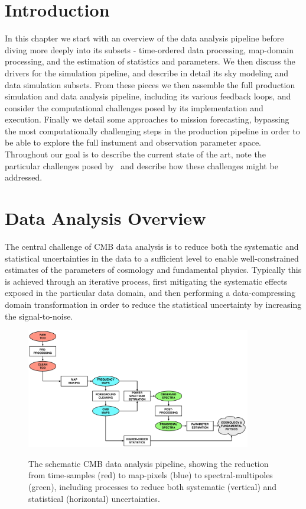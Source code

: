 \section{Introduction}

In this chapter we start with an overview of the data analysis pipeline before diving more deeply into its subsets - time-ordered data processing, map-domain processing, and the estimation of statistics and parameters. We then discuss the drivers for the simulation pipeline, and describe in detail its sky modeling and data simulation subsets. From these pieces we then assemble the full production simulation and data analysis pipeline, including its various feedback loops, and consider the computational challenges posed by its implementation and execution. Finally we detail some approaches to mission forecasting, bypassing the most computationally challenging steps in the production pipeline in order to be able to explore the full instument and observation parameter space. Throughout our goal is to describe the current state of the art, note the particular challenges posed by \cmbexp\, and describe how these challenges might be addressed. 

\section{Data Analysis Overview}

The central challenge of CMB data analysis is to reduce both the systematic and statistical uncertainties in the data to a sufficient level to enable well-constrained estimates of the parameters of cosmology and fundamental physics. Typically this is achieved through an iterative process, first mitigating the systematic effects exposed in the particular data domain, and then performing a data-compressing domain transformation in order to reduce the statistical uncertainty by increasing the signal-to-noise.

\begin{figure}[htbp]
\hspace{0.75in}\includegraphics[width=0.875\textwidth]{Analysis/da}\\
\caption{The schematic CMB data analysis pipeline, showing the reduction from time-samples (red) to map-pixels (blue) to spectral-multipoles (green), including processes to reduce both systematic (vertical) and statistical (horizontal) uncertainties.}
\label{fig_da}
\end{figure}

